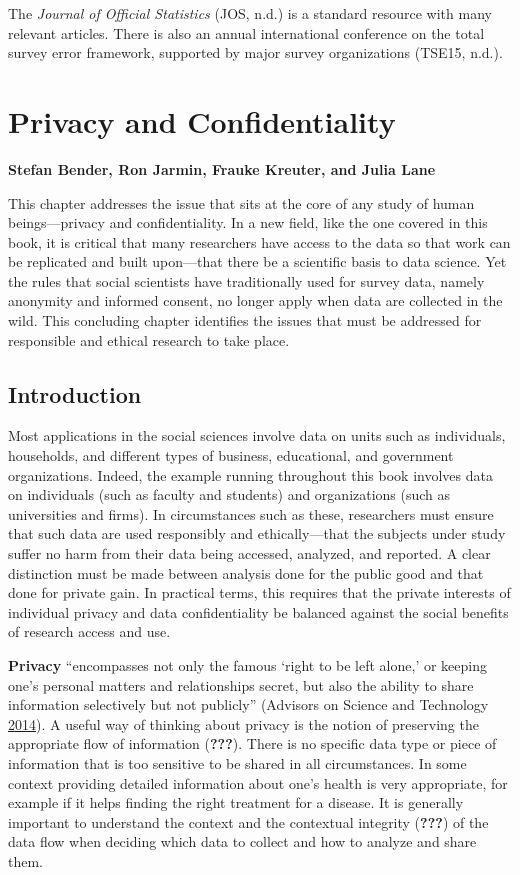 \documentclass[]{krantz}
\begin{document}
The \emph{Journal of Official Statistics} (JOS, n.d.) is a standard
resource with many relevant articles. There is also an annual
international conference on the total survey error framework, supported
by major survey organizations (TSE15, n.d.).

\hypertarget{chap:privacy}{\chapter{Privacy and
Confidentiality}\label{chap:privacy}}

\textbf{Stefan Bender, Ron Jarmin, Frauke Kreuter, and Julia Lane}

This chapter addresses the issue that sits at the core of any study of
human beings---privacy and confidentiality. In a new field, like the one
covered in this book, it is critical that many researchers have access
to the data so that work can be replicated and built upon---that there
be a scientific basis to data science. Yet the rules that social
scientists have traditionally used for survey data, namely anonymity and
informed consent, no longer apply when data are collected in the wild.
This concluding chapter identifies the issues that must be addressed for
responsible and ethical research to take place.

\section{Introduction}\label{introduction-4}

Most applications in the social sciences involve data on units such as
individuals, households, and different types of business, educational,
and government organizations. Indeed, the example running throughout
this book involves data on individuals (such as faculty and students)
and organizations (such as universities and firms). In circumstances
such as these, researchers must ensure that such data are used
responsibly and ethically---that the subjects under study suffer no harm
from their data being accessed, analyzed, and reported. A clear
distinction must be made between analysis done for the public good and
that done for private gain. In practical terms, this requires that the
private interests of individual privacy and data confidentiality be
balanced against the social benefits of research access and use.

\textbf{Privacy} ``encompasses not only the famous `right to be left
alone,' or keeping one's personal matters and relationships secret, but
also the ability to share information selectively but not publicly''
(Advisors on Science and Technology
\protect\hyperlink{ref-house2014big}{2014}). A useful way of thinking
about privacy is the notion of preserving the appropriate flow of
information ({\textbf{???}}). There is no specific data type or piece of
information that is too sensitive to be shared in all circumstances. In
some context providing detailed information about one's health is very
appropriate, for example if it helps finding the right treatment for a
disease. It is generally important to understand the context and the
contextual integrity ({\textbf{???}}) of the data flow when deciding
which data to collect and how to analyze and share them.
\end{document}
